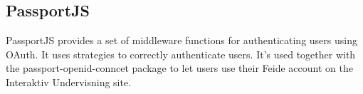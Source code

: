 \subsection{PassportJS}
PassportJS provides a set of middleware functions for authenticating users using OAuth. It uses strategies to correctly authenticate users. It's used together with the passport-openid-conncet package to let users use their Feide account on the Interaktiv Undervisning site.



